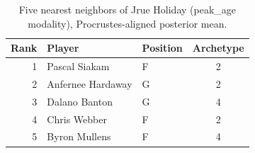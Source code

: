 \begin{table}[htbp]
  \centering\small
  \begin{tabular}{rllc}
    \toprule
    Rank & Player & Position & Archetype \\
    \midrule
    1 & Pascal Siakam & F & 2 \\
    2 & Anfernee Hardaway & G & 2 \\
    3 & Dalano Banton & G & 4 \\
    4 & Chris Webber & F & 2 \\
    5 & Byron Mullens & F & 4 \\
    \bottomrule
  \end{tabular}
  \caption{Five nearest neighbors of Jrue Holiday (peak_age modality), Procrustes-aligned posterior mean.}
  \label{tab:Jrue_Holiday_neighbors_peak_age}
\end{table}

